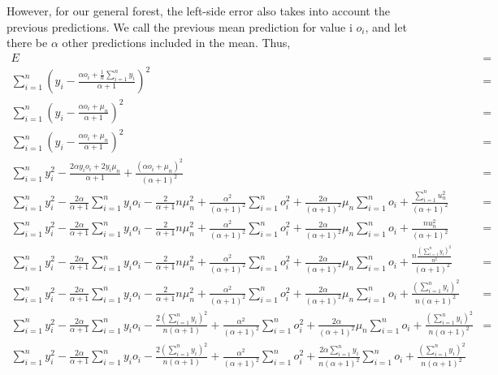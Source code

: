 \documentclass{article}
\begin{document}
However, for our general forest, the left-side error also takes into account the
previous predictions. We call the previous mean prediction for value i $o_i$, 
and let there be $\alpha$ other predictions included in the mean. Thus, 
\begin{align*}
    E &= \\
    \sum_{i=1}^n (y_i - \frac{\alpha o_i + \frac1n \sum_{i=1}^n y_i}{\alpha + 1})^2 &= \\
    \sum_{i=1}^n (y_i - \frac{\alpha o_i + \mu_n}{\alpha + 1})^2 &= \\
    \sum_{i=1}^n (y_i - \frac{\alpha o_i + \mu_n}{\alpha + 1})^2 &= \\
    \sum_{i=1}^{n} y_i^2 - \frac{2\alpha y_i o_i + 2y_i \mu_n}{\alpha + 1} + \frac{(\alpha o_i + \mu_n)^2}{(\alpha + 1)^2} &= \\
    \sum_{i=1}^{n} y_i^2 - \frac{2\alpha}{\alpha + 1} \sum_{i=1}^{n} y_i o_i - \frac{2}{\alpha + 1} n\mu_n^2 + \frac{\alpha^2}{(\alpha + 1)^2} \sum_{i=1}^{n} o_i^2 + \frac{2\alpha}{(\alpha + 1)^2} \mu_n \sum_{i=1}^{n} o_i + \frac{\sum_{i=1}^{n} u_n^2}{(\alpha + 1)^2} &= \\
    \sum_{i=1}^{n} y_i^2 - \frac{2\alpha}{\alpha + 1} \sum_{i=1}^{n} y_i o_i - \frac{2}{\alpha + 1} n\mu_n^2 + \frac{\alpha^2}{(\alpha + 1)^2} \sum_{i=1}^{n} o_i^2 + \frac{2\alpha}{(\alpha + 1)^2} \mu_n \sum_{i=1}^{n} o_i + \frac{n u_n^2}{(\alpha + 1)^2} &= \\
    \sum_{i=1}^{n} y_i^2 - \frac{2\alpha}{\alpha + 1} \sum_{i=1}^{n} y_i o_i - \frac{2}{\alpha + 1} n\mu_n^2 + \frac{\alpha^2}{(\alpha + 1)^2} \sum_{i=1}^{n} o_i^2 + \frac{2\alpha}{(\alpha + 1)^2} \mu_n \sum_{i=1}^{n} o_i + \frac{n \frac{(\sum_{i=1}^{n} y_i)^2}{n^2}}{(\alpha + 1)^2} &= \\
    \sum_{i=1}^{n} y_i^2 - \frac{2\alpha}{\alpha + 1} \sum_{i=1}^{n} y_i o_i - \frac{2}{\alpha + 1} n\mu_n^2 + \frac{\alpha^2}{(\alpha + 1)^2} \sum_{i=1}^{n} o_i^2 + \frac{2\alpha}{(\alpha + 1)^2} \mu_n \sum_{i=1}^{n} o_i + \frac{(\sum_{i=1}^{n} y_i)^2}{n(\alpha + 1)^2} &= \\
    \sum_{i=1}^{n} y_i^2 - \frac{2\alpha}{\alpha + 1} \sum_{i=1}^{n} y_i o_i - \frac{2(\sum_{i=1}^{n} y_i)^2}{n(\alpha + 1)} + \frac{\alpha^2}{(\alpha + 1)^2} \sum_{i=1}^{n} o_i^2 + \frac{2\alpha}{(\alpha + 1)^2} \mu_n \sum_{i=1}^{n} o_i + \frac{(\sum_{i=1}^{n} y_i)^2}{n(\alpha + 1)^2} &= \\
    \sum_{i=1}^{n} y_i^2 - \frac{2\alpha}{\alpha + 1} \sum_{i=1}^{n} y_i o_i - \frac{2(\sum_{i=1}^{n} y_i)^2}{n(\alpha + 1)} + \frac{\alpha^2}{(\alpha + 1)^2} \sum_{i=1}^{n} o_i^2 + \frac{2\alpha \sum_{i=1}^n y_i}{n(\alpha + 1)^2} \sum_{i=1}^{n} o_i + \frac{(\sum_{i=1}^{n} y_i)^2}{n(\alpha + 1)^2}
\end{align*}
\end{document}
